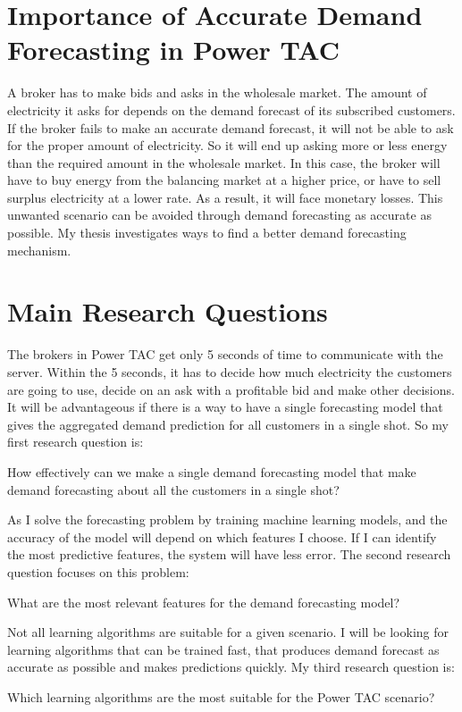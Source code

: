 \section{Importance of Accurate Demand Forecasting in Power TAC}
A broker has to make bids and asks in the wholesale market. The amount of electricity it asks for depends on the demand forecast of its subscribed customers. If the broker fails to make an accurate demand forecast, it will not be able to ask for the proper amount of electricity. So it will end up asking more or less energy than the required amount in the wholesale market. In this case, the broker will have to buy energy from the balancing market at a higher price, or have to sell surplus electricity at a lower rate. As a result, it will face monetary losses. This unwanted scenario can be avoided through demand forecasting as accurate as possible. My thesis investigates ways to find a better demand forecasting mechanism.

\section{Main Research Questions}
The brokers in Power TAC get only 5 seconds of time to communicate with the server. Within the 5 seconds, it has to decide how much electricity the customers are going to use, decide on an ask with a profitable bid and make other decisions. It will be advantageous if there is a way to have a single forecasting model that gives the aggregated demand prediction for all customers in a single shot. So my first research question is: 
\begin{displayquote}
How effectively can we make a single demand forecasting model that make demand forecasting about all the customers in a single shot?
\end{displayquote}

As I solve the forecasting problem by training machine learning models, and the accuracy of the model will depend on which features I choose. If I can identify the most predictive features, the system will have less error. The second research question focuses on this problem:
\begin{displayquote}
What are the most relevant features for the demand forecasting model?
\end{displayquote}

Not all learning algorithms are suitable for a given scenario. I will be looking for learning algorithms that can be trained fast, that produces demand forecast as accurate as possible and makes predictions quickly. My third research question is:
\begin{displayquote}
Which learning algorithms are the most suitable for the Power TAC scenario?
\end{displayquote}

